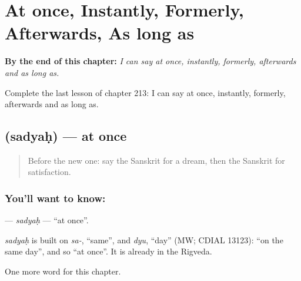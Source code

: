 
\chapter{At once, Instantly, Formerly, Afterwards, As long as}
\label{ch:sa-at-once-instantly-formerly-afterwards-as-long-as}

\begin{chapteropening}
\textbf{By the end of this chapter:} \emph{I can say at once, instantly, formerly, afterwards and as long as.}

Complete the last lesson of chapter 213: I can say at once, instantly, formerly, afterwards and as long as.
\end{chapteropening}

\section[\texorpdfstring{\sk{सद्यः} (sadyaḥ)}{सद्यः (sadyaḥ)}]{ (sadyaḥ) — at once}

\label{lesson:SA-C213-sadyah}



\begin{quote}
Before the new one: say the Sanskrit for a dream, then the Sanskrit for satisfaction.
\end{quote}

\subsection*{You'll want to know: }
\textbf{} — \emph{sadyaḥ} — \textquotedblleft{}at once\textquotedblright{}.

\begin{cousinweb}
\emph{sadyaḥ} is built on \emph{sa-}, \textquotedblleft{}same\textquotedblright{}, and \emph{dyu}, \textquotedblleft{}day\textquotedblright{} (MW; CDIAL 13123): \textquotedblleft{}on the same day\textquotedblright{}, and so \textquotedblleft{}at once\textquotedblright{}. It is already in the Rigveda.
\end{cousinweb}

\begin{grammarlens}[title={What you've built}]
One more word for this chapter.
\end{grammarlens}

